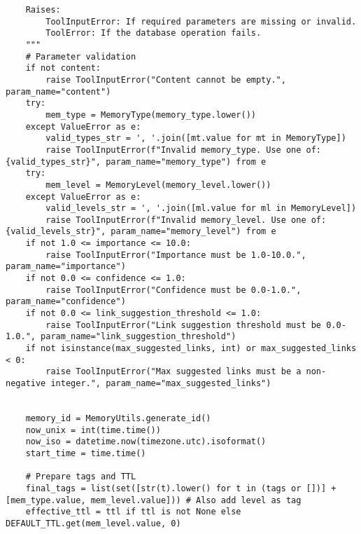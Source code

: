 \documentclass[12pt,a4paper]{article}
\begin{document}
\begin{pageablecode}
\begin{verbatim}
    Raises:
        ToolInputError: If required parameters are missing or invalid.
        ToolError: If the database operation fails.
    """
    # Parameter validation
    if not content:
        raise ToolInputError("Content cannot be empty.", param_name="content")
    try:
        mem_type = MemoryType(memory_type.lower())
    except ValueError as e:
        valid_types_str = ', '.join([mt.value for mt in MemoryType])
        raise ToolInputError(f"Invalid memory_type. Use one of: {valid_types_str}", param_name="memory_type") from e
    try:
        mem_level = MemoryLevel(memory_level.lower())
    except ValueError as e:
        valid_levels_str = ', '.join([ml.value for ml in MemoryLevel])
        raise ToolInputError(f"Invalid memory_level. Use one of: {valid_levels_str}", param_name="memory_level") from e
    if not 1.0 <= importance <= 10.0:
        raise ToolInputError("Importance must be 1.0-10.0.", param_name="importance")
    if not 0.0 <= confidence <= 1.0:
        raise ToolInputError("Confidence must be 0.0-1.0.", param_name="confidence")
    if not 0.0 <= link_suggestion_threshold <= 1.0:
        raise ToolInputError("Link suggestion threshold must be 0.0-1.0.", param_name="link_suggestion_threshold")
    if not isinstance(max_suggested_links, int) or max_suggested_links < 0:
        raise ToolInputError("Max suggested links must be a non-negative integer.", param_name="max_suggested_links")


    memory_id = MemoryUtils.generate_id()
    now_unix = int(time.time())
    now_iso = datetime.now(timezone.utc).isoformat()
    start_time = time.time()

    # Prepare tags and TTL
    final_tags = list(set([str(t).lower() for t in (tags or [])] + [mem_type.value, mem_level.value])) # Also add level as tag
    effective_ttl = ttl if ttl is not None else DEFAULT_TTL.get(mem_level.value, 0)


\end{verbatim}
\end{pageablecode}
\end{document}
